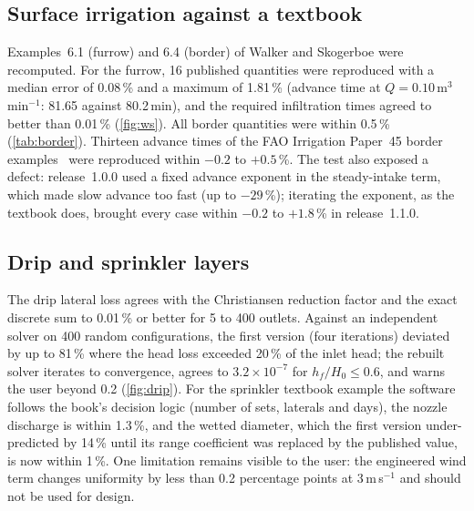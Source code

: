 \documentclass[preprint,12pt]{elsarticle}
\begin{document}
\subsection{Surface irrigation against a textbook}
Examples~6.1 (furrow) and 6.4 (border) of Walker and Skogerboe \cite{Walker1987} were recomputed. For the furrow, 16 published quantities were reproduced with a median error of 0.08\,\% and a maximum of 1.81\,\% (advance time at $Q=0.10$\,m$^3$\,min$^{-1}$: 81.65 against 80.2\,min), and the required infiltration times agreed to better than 0.01\,\% (\cref{fig:ws}). All border quantities were within 0.5\,\% (\cref{tab:border}). Thirteen advance times of the FAO Irrigation Paper~45 border examples~\cite{Walker1989} were reproduced within $-0.2$ to $+0.5$\,\%. The test also exposed a defect: release~1.0.0 used a fixed advance exponent in the steady-intake term, which made slow advance too fast (up to $-29$\,\%); iterating the exponent, as the textbook does, brought every case within $-0.2$ to $+1.8$\,\% in release~1.1.0.


\subsection{Drip and sprinkler layers}
The drip lateral loss agrees with the Christiansen reduction factor and the exact discrete sum to 0.01\,\% or better for 5 to 400 outlets. Against an independent solver on 400 random configurations, the first version (four iterations) deviated by up to 81\,\% where the head loss exceeded 20\,\% of the inlet head; the rebuilt solver iterates to convergence, agrees to $3.2\times10^{-7}$ for $h_f/H_0\le0.6$, and warns the user beyond 0.2 (\cref{fig:drip}). For the sprinkler textbook example the software follows the book's decision logic (number of sets, laterals and days), the nozzle discharge is within 1.3\,\%, and the wetted diameter, which the first version under-predicted by 14\,\% until its range coefficient was replaced by the published value, is now within 1\,\%. One limitation remains visible to the user: the engineered wind term changes uniformity by less than 0.2 percentage points at 3\,m\,s$^{-1}$ and should not be used for design.

\end{document}
